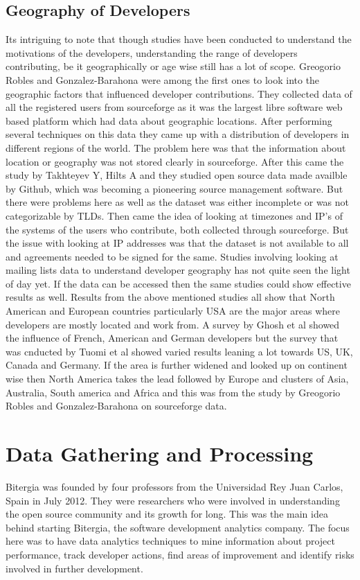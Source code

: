 \documentclass[seploa]{beavtex}
\begin{document}
\section{Geography of Developers}
Its intriguing to note that though studies have been conducted to understand the motivations of the developers, understanding the range of developers contributing, be it geographically or age wise still has a lot of scope. Greogorio Robles and Gonzalez-Barahona were among the first ones to look into the geographic factors that influenced developer contributions. They collected data of all the registered users from sourceforge as it was the largest libre software web based platform which had data about geographic locations. After performing several techniques on this data they came up with a distribution of developers in different regions of the world\cite{robles2006}. The problem here was that the information about location or geography was not stored clearly in sourceforge. After this came the study by Takhteyev Y, Hilts A and they studied open source data made availble by Github, which was becoming a pioneering source management software. But there were problems here as well as the dataset was either incomplete or was not categorizable by TLDs\cite{yuri2010}. Then came the idea of looking at timezones and IP's of the systems of the users who contribute, both collected through sourceforge. But the issue with looking at IP addresses was that the dataset is not available to all and agreements needed to be signed for the same\cite{von2010}. Studies involving looking at mailing lists data to understand developer geography has not quite seen the light of day yet. If the data can be accessed then the same studies could show effective results as well. Results from the above mentioned studies all show that North American and European countries particularly USA are the major areas where developers are mostly located and work from. A survey by Ghosh et al\cite{ghosh2005} showed the influence of French, American and German developers but the survey that was cnducted by Tuomi et al\cite{tuomi2004} showed varied results leaning a lot towards US, UK, Canada and Germany. If the area is further widened and looked up on continent wise then North America takes the lead followed by Europe and clusters of Asia, Australia, South america and Africa and this was from the study by Greogorio Robles and Gonzalez-Barahona on sourceforge data\cite{robles2006}.

\chapter{Data Gathering and Processing}
Bitergia was founded by four professors from the 	
Universidad Rey Juan Carlos, Spain in July 2012\cite{bit}. They were researchers who were involved in understanding the open source community and its growth for long. This was the main idea behind starting Bitergia, the software development analytics company. The focus here was to have data analytics techniques to mine information about project performance, track developer actions, find areas of improvement and identify risks involved in further development. 
\end{document}
